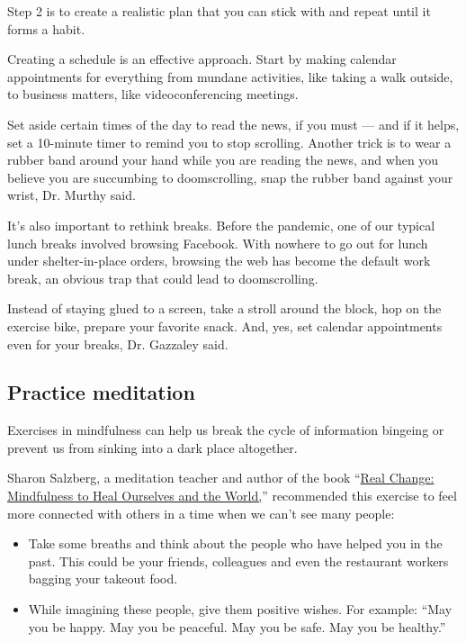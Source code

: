 Step 2 is to create a realistic plan that you can stick with and repeat
until it forms a habit.

Creating a schedule is an effective approach. Start by making calendar
appointments for everything from mundane activities, like taking a walk
outside, to business matters, like videoconferencing meetings.

Set aside certain times of the day to read the news, if you must --- and
if it helps, set a 10-minute timer to remind you to stop scrolling.
Another trick is to wear a rubber band around your hand while you are
reading the news, and when you believe you are succumbing to
doomscrolling, snap the rubber band against your wrist, Dr. Murthy said.

It's also important to rethink breaks. Before the pandemic, one of our
typical lunch breaks involved browsing Facebook. With nowhere to go out
for lunch under shelter-in-place orders, browsing the web has become the
default work break, an obvious trap that could lead to doomscrolling.

Instead of staying glued to a screen, take a stroll around the block,
hop on the exercise bike, prepare your favorite snack. And, yes, set
calendar appointments even for your breaks, Dr. Gazzaley said.

\hypertarget{practice-meditation}{%
\subsection{Practice meditation}\label{practice-meditation}}

Exercises in mindfulness can help us break the cycle of information
bingeing or prevent us from sinking into a dark place altogether.

Sharon Salzberg, a meditation teacher and author of the book
``\href{https://www.sharonsalzberg.com/realchange/}{Real Change:
Mindfulness to Heal Ourselves and the World,}'' recommended this
exercise to feel more connected with others in a time when we can't see
many people:

\begin{itemize}
\item
  Take some breaths and think about the people who have helped you in
  the past. This could be your friends, colleagues and even the
  restaurant workers bagging your takeout food.
\item
  While imagining these people, give them positive wishes. For example:
  ``May you be happy. May you be peaceful. May you be safe. May you be
  healthy.''
\end{itemize}

